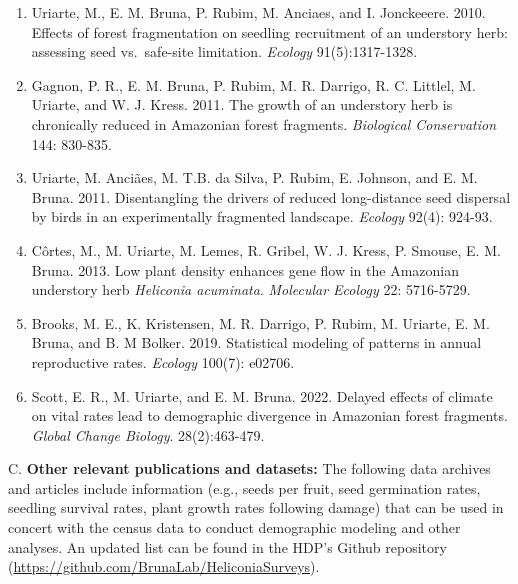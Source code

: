 \documentclass[
  12pt,
  man, donotrepeattitle]{apa6}
\begin{document}
\begin{enumerate}
\item
  Uriarte, M., E. M. Bruna, P. Rubim, M. Anciaes, and I. Jonckeeere. 2010. Effects of forest fragmentation on seedling recruitment of an understory herb: assessing seed vs.~safe-site limitation. \emph{Ecology} 91(5):1317-1328.
\item
  Gagnon, P. R., E. M. Bruna, P. Rubim, M. R. Darrigo, R. C. Littlel, M. Uriarte, and W. J. Kress. 2011. The growth of an understory herb is chronically reduced in Amazonian forest fragments. \emph{Biological Conservation} 144: 830-835.
\item
  Uriarte, M. Anciães, M. T.B. da Silva, P. Rubim, E. Johnson, and E. M. Bruna. 2011. Disentangling the drivers of reduced long-distance seed dispersal by birds in an experimentally fragmented landscape. \emph{Ecology} 92(4): 924-93.
\item
  Côrtes, M., M. Uriarte, M. Lemes, R. Gribel, W. J. Kress, P. Smouse, E. M. Bruna. 2013. Low plant density enhances gene flow in the Amazonian understory herb \emph{Heliconia acuminata}. \emph{Molecular Ecology} 22: 5716-5729.
\item
  Brooks, M. E., K. Kristensen, M. R. Darrigo, P. Rubim, M. Uriarte, E. M. Bruna, and B. M Bolker. 2019. Statistical modeling of patterns in annual reproductive rates. \emph{Ecology} 100(7): e02706.
\item
  Scott, E. R., M. Uriarte, and E. M. Bruna. 2022. Delayed effects of climate on vital rates lead to demographic divergence in Amazonian forest fragments. \emph{Global Change Biology}. 28(2):463-479.
\end{enumerate}

\noindent  
C. \textbf{Other relevant publications and datasets:} The following data archives and articles include information (e.g., seeds per fruit, seed germination rates, seedling survival rates, plant growth rates following damage) that can be used in concert with the census data to conduct demographic modeling and other analyses. An updated list can be found in the HDP's Github repository (\url{https://github.com/BrunaLab/HeliconiaSurveys}).
\end{document}
